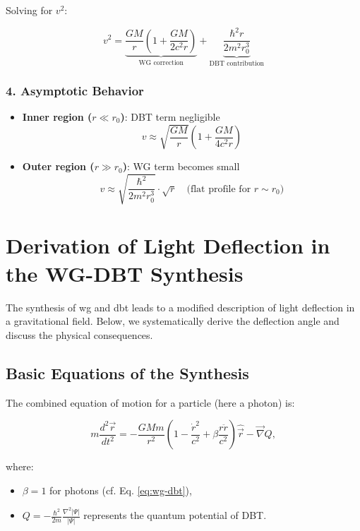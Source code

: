 Solving for $v^2$:

\begin{equation}
    \label{eq:rotationskurve}
    \boxed
    {
        v^2 = \underbrace{\frac{GM}{r}\left(1 + \frac{GM}{2c^2r}\right)}_{\text{WG correction}} + \underbrace{\frac{\hbar^2 r}{2m^2 r_0^3}}_{\text{DBT contribution}}
    }
\end{equation}

\subsubsection{4. Asymptotic Behavior}
\begin{itemize}
\item \textbf{Inner region ($r \ll r_0$)}: DBT term negligible
\begin{equation}
v \approx \sqrt{\frac{GM}{r}} \left(1 + \frac{GM}{4c^2r}\right)
\end{equation}

\item \textbf{Outer region ($r \gg r_0$)}: WG term becomes small
\begin{equation}
v \approx \sqrt{\frac{\hbar^2}{2m^2 r_0^3}} \cdot \sqrt{r} \quad \text{(flat profile for $r \sim r_0$)}
\end{equation}
\end{itemize}

\section{Derivation of Light Deflection in the WG-DBT Synthesis}
\label{sec:lichtablenkung}

The synthesis of \gls{wg} and \gls{dbt} leads to a modified description of light deflection in a gravitational field. Below, we systematically derive the deflection angle and discuss the physical consequences.

\subsection{Basic Equations of the Synthesis}
The combined equation of motion for a particle (here a photon) is:

\begin{equation}
m \frac{d^2 \vec{r}}{dt^2} = -\frac{GMm}{r^2} \left(1 - \frac{\dot{r}^2}{c^2} + \beta \frac{r \ddot{r}}{c^2}\right) \hat{\vec{r}} - \vec{\nabla} Q,
\end{equation}

where:
\begin{itemize}
\item $\beta = 1$ for photons (cf. Eq. \ref{eq:wg-dbt}),
\item $Q = -\frac{\hbar^2}{2m} \frac{\nabla^2 |\Psi|}{|\Psi|}$ represents the quantum potential of DBT.
\end{itemize}

